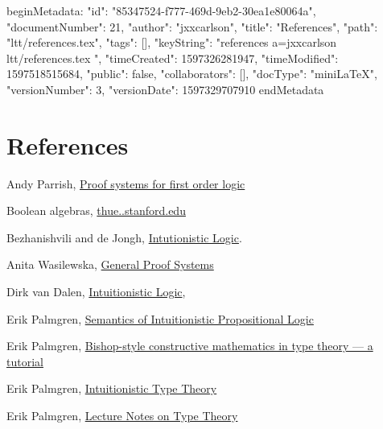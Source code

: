 beginMetadata:
{
    "id": "85347524-f777-469d-9eb2-30ea1e80064a",
    "documentNumber": 21,
    "author": "jxxcarlson",
    "title": "References",
    "path": "ltt/references.tex",
    "tags": [],
    "keyString": "references a=jxxcarlson ltt/references.tex ",
    "timeCreated": 1597326281947,
    "timeModified": 1597518515684,
    "public": false,
    "collaborators": [],
    "docType": "miniLaTeX",
    "versionNumber": 3,
    "versionDate": 1597329707910
}
endMetadata

\section{References}


\begin{thebibliography}




 Andy Parrish, \href{https://www.math.ucsd.edu/~sbuss/CourseWeb/Math260_2012WS/Feb10Parrish.pdf}{Proof systems for first order logic}

 Boolean algebras, \href{http://thue.stanford.edu/bool.html}{thue..stanford.edu}

 Bezhanishvili and de Jongh,  \href{https://www.illc.uva.nl/Research/Publications/Reports/PP-2006-25.text.pdf}{Intutionistic Logic}. 

 Anita Wasilewska, \href{https://www3.cs.stonybrook.edu/~cse541/chapter7.pdf}{General Proof Systems}

 Dirk van Dalen,  \href{https://pdfs.semanticscholar.org/1e75/6d625d4cf2d91f69149b3d5a1f2d07fe4b2f.pdf}{Intuitionistic Logic}, 

 Erik Palmgren, \href{http://www2.math.uu.se/~palmgren/tillog/heyting3.pdf}{Semantics of Intuitionistic Propositional Logic}

 Erik Palmgren, \href{http://staff.math.su.se/palmgren/Palmgren_Nis.pdf}{Bishop-style constructive mathematics in type theory — a tutorial}

 Erik Palmgren, \href{http://www.cse.chalmers.se/~peterd/papers/IntuitionisticTypeTheory150505.pdf}{Intuitionistic Type Theory}

 Erik Palmgren, \href{http://staff.math.su.se/palmgren/lecturenotesTT.pdf}{Lecture Notes on Type Theory}


\end{thebibliography}

